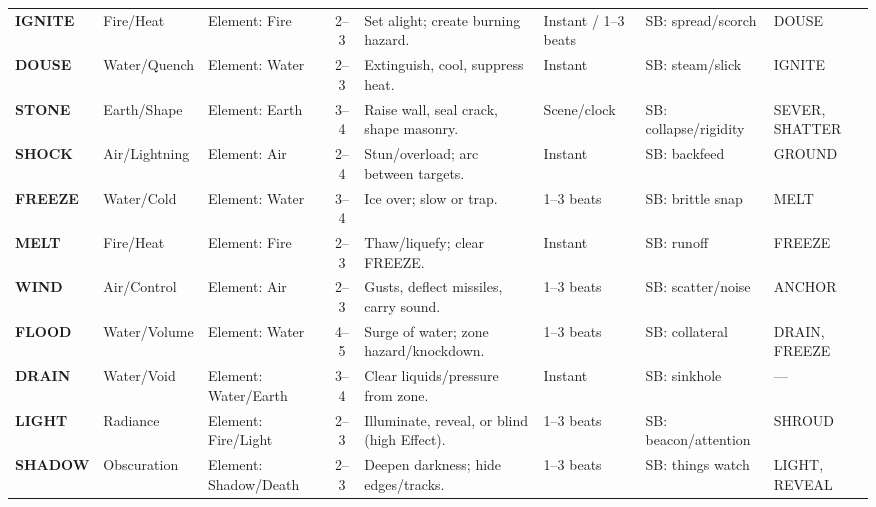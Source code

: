 \begin{longtable}{@{} l l p{4.2cm} c p{6.5cm} p{2.2cm} p{3.2cm} p{2.2cm} @{}}
\textbf{IGNITE}    & Fire/Heat         & Element: Fire                        & 2--3 & Set alight; create burning hazard. & Instant / 1–3 beats & SB: spread/scorch & DOUSE \\
\textbf{DOUSE}     & Water/Quench      & Element: Water                       & 2--3 & Extinguish, cool, suppress heat. & Instant & SB: steam/slick & IGNITE \\
\textbf{STONE}     & Earth/Shape       & Element: Earth                       & 3--4 & Raise wall, seal crack, shape masonry. & Scene/clock & SB: collapse/rigidity & SEVER, SHATTER \\
\textbf{SHOCK}     & Air/Lightning     & Element: Air                         & 2--4 & Stun/overload; arc between targets. & Instant & SB: backfeed & GROUND \\
\textbf{FREEZE}    & Water/Cold        & Element: Water                       & 3--4 & Ice over; slow or trap. & 1–3 beats & SB: brittle snap & MELT \\
\textbf{MELT}      & Fire/Heat         & Element: Fire                        & 2--3 & Thaw/liquefy; clear FREEZE. & Instant & SB: runoff & FREEZE \\
\textbf{WIND}      & Air/Control       & Element: Air                         & 2--3 & Gusts, deflect missiles, carry sound. & 1–3 beats & SB: scatter/noise & ANCHOR \\
\textbf{FLOOD}     & Water/Volume      & Element: Water                       & 4--5 & Surge of water; zone hazard/knockdown. & 1–3 beats & SB: collateral & DRAIN, FREEZE \\
\textbf{DRAIN}     & Water/Void        & Element: Water/Earth                 & 3--4 & Clear liquids/pressure from zone. & Instant & SB: sinkhole & — \\
\textbf{LIGHT}     & Radiance          & Element: Fire/Light                  & 2--3 & Illuminate, reveal, or blind (high Effect). & 1–3 beats & SB: beacon/attention & SHROUD \\
\textbf{SHADOW}    & Obscuration       & Element: Shadow/Death                & 2--3 & Deepen darkness; hide edges/tracks. & 1–3 beats & SB: things watch & LIGHT, REVEAL \\


\end{longtable}

